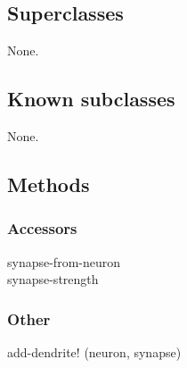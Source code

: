\documentclass[english]{article}
\begin{document}
\subsection{Superclasses}
None.

\subsection{Known subclasses}
None.

\subsection{Methods}

\subsubsection{Accessors}
synapse-from-neuron\\
synapse-strength\\

\subsubsection{Other}
add-dendrite! (neuron, synapse)\\
\end{document}
